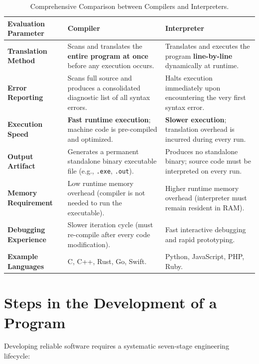 \begin{table}[htbp]
\centering
\small
\renewcommand{\arraystretch}{1.3}
\begin{tabularx}{\linewidth}{l>{\raggedright\arraybackslash}X>{\raggedright\arraybackslash}X}
\toprule
\textbf{Evaluation Parameter} & \textbf{Compiler} & \textbf{Interpreter} \\
\midrule
\textbf{Translation Method} & Scans and translates the \textbf{entire program at once} before any execution occurs. & Translates and executes the program \textbf{line-by-line} dynamically at runtime. \\
\textbf{Error Reporting} & Scans full source and produces a consolidated diagnostic list of all syntax errors. & Halts execution immediately upon encountering the very first syntax error. \\
\textbf{Execution Speed} & \textbf{Fast runtime execution}; machine code is pre-compiled and optimized. & \textbf{Slower execution}; translation overhead is incurred during every run. \\
\textbf{Output Artifact} & Generates a permanent standalone binary executable file (e.g., \texttt{.exe}, \texttt{.out}). & Produces no standalone binary; source code must be interpreted on every run. \\
\textbf{Memory Requirement} & Low runtime memory overhead (compiler is not needed to run the executable). & Higher runtime memory overhead (interpreter must remain resident in RAM). \\
\textbf{Debugging Experience} & Slower iteration cycle (must re-compile after every code modification). & Fast interactive debugging and rapid prototyping. \\
\textbf{Example Languages} & C, C++, Rust, Go, Swift. & Python, JavaScript, PHP, Ruby. \\
\bottomrule
\end{tabularx}
\caption{Comprehensive Comparison between Compilers and Interpreters.}
\label{tab:compiler-vs-interpreter}
\end{table}

\section{Steps in the Development of a Program}

Developing reliable software requires a systematic seven-stage engineering lifecycle:


